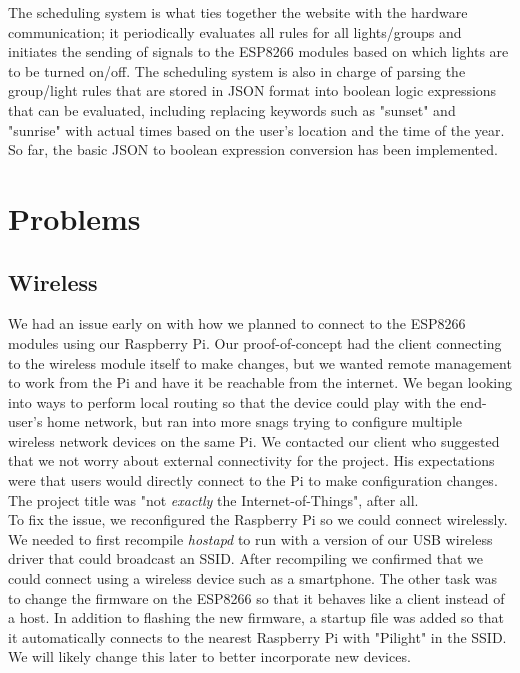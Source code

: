 \documentclass[oneside,openright]{book}
\begin{document}
The scheduling system is what ties together the website with the hardware
communication; it periodically evaluates all rules for all lights/groups and
initiates the sending of signals to the ESP8266 modules based on which lights
are to be turned on/off.  The scheduling system is also in charge of parsing
the group/light rules that are stored in JSON format into boolean logic
expressions that can be evaluated, including replacing keywords such as
"sunset" and "sunrise" with actual times based on the user's location and the
time of the year.  So far, the basic JSON to boolean expression conversion has
been implemented.

\section{Problems}

\subsection{Wireless}

We had an issue early on with how we planned to connect to the ESP8266 modules
using our Raspberry Pi. Our proof-of-concept had the client connecting to the
wireless module itself to make changes, but we wanted remote management to work
from the Pi and have it be reachable from the internet. We began looking into
ways to perform local routing so that the device could play with the end-user's
home network, but ran into more snags trying to configure multiple wireless
network devices on the same Pi. We contacted our client who suggested that we
not worry about external connectivity for the project. His expectations were
that users would directly connect to the Pi to make configuration changes. The
project title was "not \textit{exactly} the Internet-of-Things", after all.\\

To fix the issue, we reconfigured the Raspberry Pi so we could connect
wirelessly. We needed to first recompile \textit{hostapd} to run with a version
of our USB wireless driver that could broadcast an SSID. After recompiling we
confirmed that we could connect using a wireless device such as a smartphone.
The other task was to change the firmware on the ESP8266 so that it behaves
like a client instead of a host. In addition to flashing the new firmware, a
startup file was added so that it automatically connects to the nearest
Raspberry Pi with "Pilight" in the SSID. We will likely change this later to
better incorporate new devices.
\end{document}

